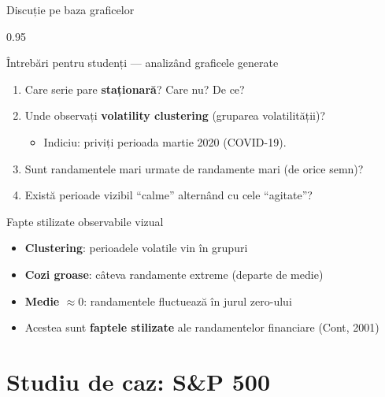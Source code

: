 \documentclass[9pt, aspectratio=169, t]{beamer}
\begin{document}
\begin{frame}{Discuție pe baza graficelor}
    \begin{cminipage}{0.95\textwidth}
    \begin{alertblock}{Întrebări pentru studenți --- analizând graficele generate}
    \begin{enumerate}\setlength{\itemsep}{0pt}
        \item Care serie pare \textbf{staționară}? Care nu? De ce?
        \item Unde observați \textbf{volatility clustering} (gruparea volatilității)?
        \begin{itemize}\setlength{\itemsep}{0pt}
            \item Indiciu: priviți perioada martie 2020 (COVID-19).
        \end{itemize}
        \item Sunt randamentele mari urmate de randamente mari (de orice semn)?
        \item Există perioade vizibil ``calme'' alternând cu cele ``agitate''?
    \end{enumerate}
    \end{alertblock}
    \vspace{0.1cm}
    \begin{exampleblock}{Fapte stilizate observabile vizual}
    \begin{itemize}\setlength{\itemsep}{0pt}
        \item \textbf{Clustering}: perioadele volatile vin în grupuri
        \item \textbf{Cozi groase}: câteva randamente extreme (departe de medie)
        \item \textbf{Medie $\approx 0$}: randamentele fluctuează în jurul zero-ului
        \item Acestea sunt \textbf{faptele stilizate} ale randamentelor financiare (Cont, 2001)
    \end{itemize}
    \end{exampleblock}
    \end{cminipage}
\end{frame}

\section{Studiu de caz: S\&P 500}
\end{document}
